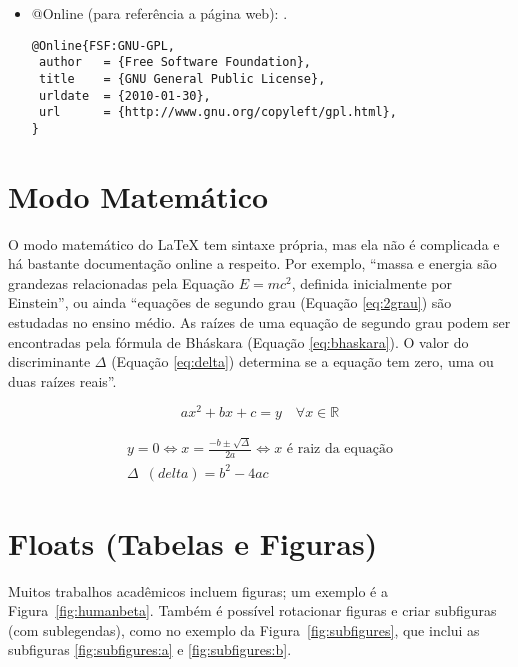 \begin{itemize}
\item @Online (para referência a página web): \cite{FSF:GNU-GPL}.
{\scriptsize\begin{verbatim}
@Online{FSF:GNU-GPL,
 author   = {Free Software Foundation},
 title    = {GNU General Public License},
 urldate  = {2010-01-30},
 url      = {http://www.gnu.org/copyleft/gpl.html},
}
\end{verbatim}
}

\end{itemize}

\section{Modo Matemático}

O modo matemático do \LaTeX{} tem sintaxe própria, mas ela não é complicada
e há bastante documentação online a respeito. Por exemplo, ``massa e energia
são grandezas relacionadas pela Equação $E=mc^2$, definida inicialmente por
Einstein'', ou ainda ``equações de segundo grau (Equação \ref{eq:2grau})
são estudadas no ensino médio. As raízes de uma equação de segundo grau
podem ser encontradas pela fórmula de Bháskara (Equação \ref{eq:bhaskara}).
O valor do discriminante $\Delta$ (Equação \ref{eq:delta}) determina
se a equação tem zero, uma ou duas raízes reais''.

\begin{equation}
  \label{eq:2grau}
  ax^2+bx+c=y \quad \forall x \in \mathbb{R}
\end{equation}

\begin{gather}
\label{eq:bhaskara}
    y=0 \Leftrightarrow x=\frac{-b \pm \sqrt{\Delta}}{2a}
    \Leftrightarrow x \text{ é raiz da equação}\\
\label{eq:delta}
    \Delta\enspace(\mathit{delta}) = b^2-4ac
\end{gather}

\section{Floats (Tabelas e Figuras)}

Muitos trabalhos acadêmicos incluem figuras; um exemplo é a
Figura~\ref{fig:humanbeta}. Também é possível
rotacionar figuras e criar subfiguras (com sublegendas), como
no exemplo da Figura~\ref{fig:subfigures},
que inclui as subfiguras \ref{fig:subfigures:a} e
\ref{fig:subfigures:b}.

